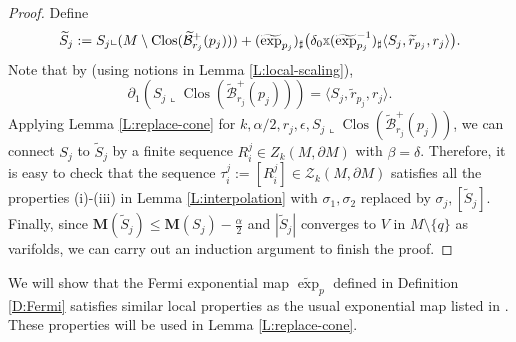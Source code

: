 \documentclass[10pt]{amsart}
\theoremstyle{definition}
\theoremstyle{remark}
\numberwithin{equation}{section}
\newcommand{\al}{\alpha}
\newcommand{\be}{\beta}
\newcommand{\lan}{\langle}
\newcommand{\ran}{\rangle}
\newcommand{\la}{\lambda}
\newcommand{\lc}{\llcorner}
\newcommand{\si}{\sigma}
\newcommand{\de}{\delta}
\newcommand{\ep}{\epsilon}
\newcommand{\Z}{\mathcal{Z}}
\newcommand{\M}{\mathbf{M}}
\newcommand{\ttimes}{\scalebox{0.7}{$\mathbb{X}$}}
\newcommand{\tE}{\widetilde{\exp}}
\newcommand{\tBcal}{\widetilde{\mathcal{B}}}
\newcommand{\tS}{\widetilde{S}}
\newcommand{\tir}{\widetilde{r}}
\newcommand{\Clos}{\operatorname{Clos}}
\begin{document}
\begin{proof}
Define
\[ \tS_j:=S_j \lc (M\setminus \Clos(\tBcal^+_{r_j}(p_j)))+(\tE_{p_j})_{\sharp}\big(\de_0\ttimes (\tE_{p_j}^{-1})_{\sharp}\lan S_j, \tir_{p_j}, r_j\ran\big).\]
Note that by \cite[28.5(2)]{Simon} (using notions in Lemma \ref{L:local-scaling}),
\[ \partial_1 (S_j\lc \Clos(\tBcal^+_{r_j}(p_j)))=\lan S_j, \tir_{p_j}, r_j\ran.\]
Applying Lemma \ref{L:replace-cone} for $k, \al/2, r_j, \ep, S_j\lc \Clos(\tBcal^+_{r_j}(p_j))$, we can connect $S_j$ to $\tS_j$ by a finite sequence $R^j_i\in Z_k(M, \partial M)$ with $\be=\de$. Therefore, it is easy to check that the sequence $\tau^j_i:=[R^j_i] \in \Z_k(M,\partial M)$ satisfies all the properties (i)-(iii) in Lemma \ref{L:interpolation} with $\si_1, \si_2$ replaced by $\si_j, [\tS_j]$.
Finally, since $\M(\tS_j)\leq \M(S_j)-\frac{\al}{2}$ and $|\tS_j|$ converges to $V$ in $M\setminus\{q\}$ as varifolds, 
we can carry out an induction argument to finish the proof.
\end{proof}


We will show that the Fermi exponential map $\tE_p$ defined in Definition \ref{D:Fermi} satisfies similar local properties as the usual exponential map listed in \cite[3.4(4)(7)]{Pitts}. These properties will be used in Lemma \ref{L:replace-cone}.

\end{document}
